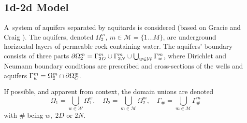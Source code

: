 \subsection{1d-2d Model}
% 
% 

% 

A~system of aquifers separated by aquitards is considered (based on Gracie and Craig \cite{gracie_modelling_2010,craig_using_2011}).
The aquifers, denoted $\Omega^m_2$, $m\in\mathcal{M}=\{1\ldots M\}$, are underground horizontal layers of permeable rock containing water.
The aquifers' boundary consists of three parts $\partial\Omega^m_2 = \Gamma^m_{2D} \cup \Gamma^m_{2N} \cup \bigcup_{\substack{w\in\mathcal{W}}} \Gamma^m_w$,
where Dirichlet and Neumann boundary conditions are prescribed and cross-sections of the wells and aquifers $\Gamma^m_w = \Omega^m_2 \cap \partial\Omega^w_C$.

If possible, and apparent from context, the domain unions are denoted
\begin{equation}
    \Omega_1 = \bigcup_{w\in\mathcal{W}} \Omega^w_1, \quad \Omega_2 = \bigcup_{m\in\mathcal{M}} \Omega^m_2, \quad \Gamma_{\#} = \bigcup_{m\in\mathcal{M}} \Gamma^m_{\#}
\end{equation}
with $\#$ being $w,\; 2D$ or $2N$.

